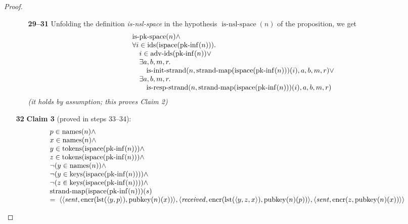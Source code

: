 \documentclass[11pt]{article}
\theoremstyle{plain}
\begin{document}
\begin{proof}
\begin{itemize}[leftmargin=2.8em, itemsep=4pt, parsep=1pt]
  \begin{itemize}[leftmargin=2.8em, itemsep=4pt, parsep=1pt]
  \item[\textbf{29--31}] Unfolding the definition \emph{is-nsl-space} in the hypothesis $\operatorname{is\text{-}nsl\text{-}space}(n)$ of the proposition, we get
\begin{equation*}
\begin{array}{@{}l@{}} \operatorname{is\text{-}pk\text{-}space}(n) \wedge \\ \forall i \in \operatorname{ids}(\operatorname{ispace}(\operatorname{pk\text{-}inf}(n))). \\ \quad i \in \operatorname{adv\text{-}ids}(\operatorname{pk\text{-}inf}(n)) \vee \\ \quad \exists a, b, m, r. \\ \quad \quad \operatorname{is\text{-}init\text{-}strand}(n, \operatorname{strand\text{-}map}(\operatorname{ispace}(\operatorname{pk\text{-}inf}(n)))(i), a, b, m, r) \vee \\ \quad \exists a, b, m, r. \\ \quad \quad \operatorname{is\text{-}resp\text{-}strand}(n, \operatorname{strand\text{-}map}(\operatorname{ispace}(\operatorname{pk\text{-}inf}(n)))(i), a, b, m, r) \end{array}
\end{equation*}
  \emph{(it holds by assumption; this proves Claim 2)}
  \end{itemize}
  \item[\textbf{32}] \textbf{Claim 3} (proved in steps 33--34):
\begin{equation*}
\begin{array}{@{}l@{}} p \in \operatorname{names}(n) \wedge \\ x \in \operatorname{names}(n) \wedge \\ y \in \operatorname{tokens}(\operatorname{ispace}(\operatorname{pk\text{-}inf}(n))) \wedge \\ z \in \operatorname{tokens}(\operatorname{ispace}(\operatorname{pk\text{-}inf}(n))) \wedge \\ \neg (y \in \operatorname{names}(n)) \wedge \\ \neg (y \in \operatorname{keys}(\operatorname{ispace}(\operatorname{pk\text{-}inf}(n)))) \wedge \\ \neg (z \in \operatorname{keys}(\operatorname{ispace}(\operatorname{pk\text{-}inf}(n)))) \wedge \\ \operatorname{strand\text{-}map}(\operatorname{ispace}(\operatorname{pk\text{-}inf}(n)))(s) \\ =\; \langle \langle \mathit{sent}, \operatorname{encr}(\operatorname{lst}(\langle y, p \rangle), \operatorname{pubkey}(n)(x)) \rangle, \langle \mathit{received}, \operatorname{encr}(\operatorname{lst}(\langle y, z, x \rangle), \operatorname{pubkey}(n)(p)) \rangle, \langle \mathit{sent}, \operatorname{encr}(z, \operatorname{pubkey}(n)(x)) \rangle \rangle \end{array}
\end{equation*}


\end{itemize}
\end{proof}
\end{document}
